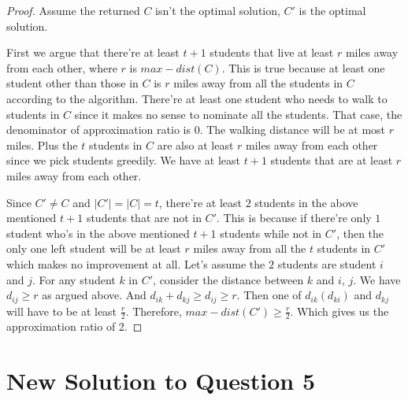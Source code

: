 \documentclass[11pt]{article}
\begin{document}
\begin{proof}
	Assume the returned $C$ isn't the optimal solution, $C'$ is the optimal solution.

	\noindent First we argue that there're at least $t+1$ students that live at least $r$ miles away from each other, where $r$ is $max-dist(C)$.
	This is true because at least one student other than those in $C$ is $r$ miles away from all the students in $C$ according to the algorithm.
	There're at least one student who needs to walk to students in $C$ since it makes no sense to nominate all the students.
	That case, the denominator of approximation ratio is $0$.
	The walking distance will be at most $r$ miles.
	Plus the $t$ students in $C$ are also at least $r$ miles away from each other since we pick students greedily.
	We have at least $t+1$ students that are at least $r$ miles away from each other.

	\noindent Since $C' \neq C$ and $|C'| = |C| = t$, there're at least $2$ students in the above mentioned $t+1$ students that are not in $C'$.
	This is because if there're only $1$ student who's in the above mentioned $t+1$ students while not in $C'$, then the only one left student will be at least $r$ miles away from all the $t$ students in $C'$ which makes no improvement at all.
	Let's assume the $2$ students are student $i$ and $j$.
	For any student $k$ in $C'$, consider the distance between $k$ and $i$, $j$.
	We have $d_{ij} \geq r$ as argued above.
	And $d_{ik} + d_{kj} \geq d_{ij} \geq r$. Then one of $d_{ik} (d_{ki})$ and $d_{kj}$ will have to be at least $\frac{r}{2}$.
	Therefore, $max-dist(C') \geq \frac{r}{2}$.
	Which gives us the approximation ratio of 2.
\end{proof}

\section{New Solution to Question 5}
\end{document}
